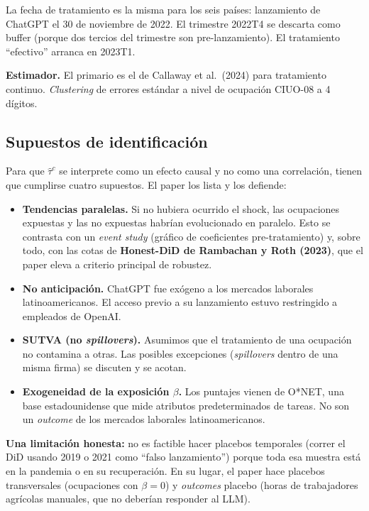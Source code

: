 \documentclass[12pt]{article}
\begin{document}
La fecha de tratamiento es la misma para los seis países: lanzamiento de ChatGPT el 30 de noviembre de 2022. El trimestre 2022T4 se descarta como buffer (porque dos tercios del trimestre son pre-lanzamiento). El tratamiento ``efectivo'' arranca en 2023T1.

\textbf{Estimador.} El primario es el de Callaway et al.\ (2024) para tratamiento continuo. \emph{Clustering} de errores estándar a nivel de ocupación CIUO-08 a 4 dígitos.

\subsection{Supuestos de identificación}

Para que $\hat\tau^c$ se interprete como un efecto causal y no como una correlación, tienen que cumplirse cuatro supuestos. El paper los lista y los defiende:

\begin{itemize}
  \item \textbf{Tendencias paralelas.} Si no hubiera ocurrido el shock, las ocupaciones expuestas y las no expuestas habrían evolucionado en paralelo. Esto se contrasta con un \emph{event study} (gráfico de coeficientes pre-tratamiento) y, sobre todo, con las cotas de \textbf{Honest-DiD de Rambachan y Roth (2023)}, que el paper eleva a criterio principal de robustez.
  \item \textbf{No anticipación.} ChatGPT fue exógeno a los mercados laborales latinoamericanos. El acceso previo a su lanzamiento estuvo restringido a empleados de OpenAI.
  \item \textbf{SUTVA (no \emph{spillovers}).} Asumimos que el tratamiento de una ocupación no contamina a otras. Las posibles excepciones (\emph{spillovers} dentro de una misma firma) se discuten y se acotan.
  \item \textbf{Exogeneidad de la exposición $\beta$.} Los puntajes vienen de O*NET, una base estadounidense que mide atributos predeterminados de tareas. No son un \emph{outcome} de los mercados laborales latinoamericanos.
\end{itemize}

\textbf{Una limitación honesta:} no es factible hacer placebos temporales (correr el DiD usando 2019 o 2021 como ``falso lanzamiento'') porque toda esa muestra está en la pandemia o en su recuperación. En su lugar, el paper hace placebos transversales (ocupaciones con $\beta = 0$) y \emph{outcomes} placebo (horas de trabajadores agrícolas manuales, que no deberían responder al LLM).
\end{document}

